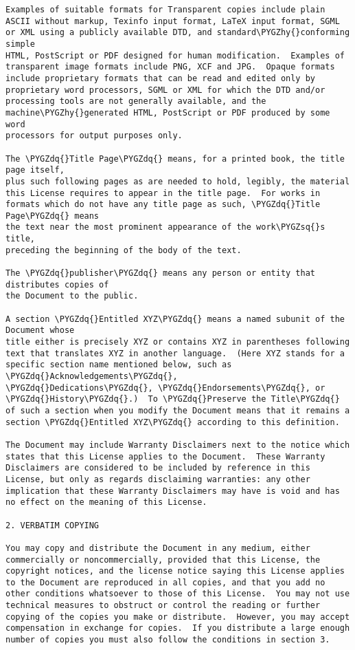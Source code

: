 \documentclass[letterpaper,10pt,english]{sphinxmanual}
\def\PYGZhy{\char`\-}
\def\PYGZsq{\char`\'}
\def\PYGZdq{\char`\"}
\renewcommand\PYGZsq{\textquotesingle}
\begin{document}
\begin{Verbatim}[frame=single,commandchars=\\\{\}]
Examples of suitable formats for Transparent copies include plain
ASCII without markup, Texinfo input format, LaTeX input format, SGML
or XML using a publicly available DTD, and standard\PYGZhy{}conforming simple
HTML, PostScript or PDF designed for human modification.  Examples of
transparent image formats include PNG, XCF and JPG.  Opaque formats
include proprietary formats that can be read and edited only by
proprietary word processors, SGML or XML for which the DTD and/or
processing tools are not generally available, and the
machine\PYGZhy{}generated HTML, PostScript or PDF produced by some word
processors for output purposes only.

The \PYGZdq{}Title Page\PYGZdq{} means, for a printed book, the title page itself,
plus such following pages as are needed to hold, legibly, the material
this License requires to appear in the title page.  For works in
formats which do not have any title page as such, \PYGZdq{}Title Page\PYGZdq{} means
the text near the most prominent appearance of the work\PYGZsq{}s title,
preceding the beginning of the body of the text.

The \PYGZdq{}publisher\PYGZdq{} means any person or entity that distributes copies of
the Document to the public.

A section \PYGZdq{}Entitled XYZ\PYGZdq{} means a named subunit of the Document whose
title either is precisely XYZ or contains XYZ in parentheses following
text that translates XYZ in another language.  (Here XYZ stands for a
specific section name mentioned below, such as \PYGZdq{}Acknowledgements\PYGZdq{},
\PYGZdq{}Dedications\PYGZdq{}, \PYGZdq{}Endorsements\PYGZdq{}, or \PYGZdq{}History\PYGZdq{}.)  To \PYGZdq{}Preserve the Title\PYGZdq{}
of such a section when you modify the Document means that it remains a
section \PYGZdq{}Entitled XYZ\PYGZdq{} according to this definition.

The Document may include Warranty Disclaimers next to the notice which
states that this License applies to the Document.  These Warranty
Disclaimers are considered to be included by reference in this
License, but only as regards disclaiming warranties: any other
implication that these Warranty Disclaimers may have is void and has
no effect on the meaning of this License.

2. VERBATIM COPYING

You may copy and distribute the Document in any medium, either
commercially or noncommercially, provided that this License, the
copyright notices, and the license notice saying this License applies
to the Document are reproduced in all copies, and that you add no
other conditions whatsoever to those of this License.  You may not use
technical measures to obstruct or control the reading or further
copying of the copies you make or distribute.  However, you may accept
compensation in exchange for copies.  If you distribute a large enough
number of copies you must also follow the conditions in section 3.


\end{Verbatim}
\end{document}
